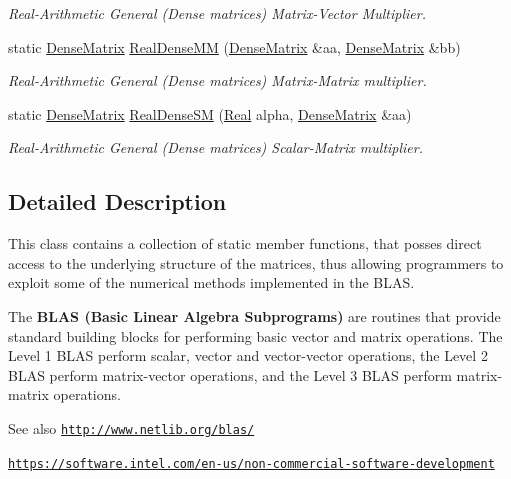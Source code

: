 \begin{DoxyCompactItemize}
\begin{DoxyCompactList}\small\item\em Real-\/\+Arithmetic General (Dense matrices) Matrix-\/\+Vector Multiplier. \end{DoxyCompactList}\item 
static \hyperlink{classmtk_1_1DenseMatrix}{Dense\+Matrix} \hyperlink{classmtk_1_1BLASAdapter_acebd0e9bfe0bdd609c7fbea98ccfd3b5}{Real\+Dense\+M\+M} (\hyperlink{classmtk_1_1DenseMatrix}{Dense\+Matrix} \&aa, \hyperlink{classmtk_1_1DenseMatrix}{Dense\+Matrix} \&bb)
\begin{DoxyCompactList}\small\item\em Real-\/\+Arithmetic General (Dense matrices) Matrix-\/\+Matrix multiplier. \end{DoxyCompactList}\item 
static \hyperlink{classmtk_1_1DenseMatrix}{Dense\+Matrix} \hyperlink{classmtk_1_1BLASAdapter_a0dd80d043615a95f11b7341ce69b44d3}{Real\+Dense\+S\+M} (\hyperlink{group__c01-roots_gac080bbbf5cbb5502c9f00405f894857d}{Real} alpha, \hyperlink{classmtk_1_1DenseMatrix}{Dense\+Matrix} \&aa)
\begin{DoxyCompactList}\small\item\em Real-\/\+Arithmetic General (Dense matrices) Scalar-\/\+Matrix multiplier. \end{DoxyCompactList}\end{DoxyCompactItemize}


\subsection{Detailed Description}
This class contains a collection of static member functions, that posses direct access to the underlying structure of the matrices, thus allowing programmers to exploit some of the numerical methods implemented in the B\+L\+A\+S.

The {\bfseries B\+L\+A\+S (Basic Linear Algebra Subprograms)} are routines that provide standard building blocks for performing basic vector and matrix operations. The Level 1 B\+L\+A\+S perform scalar, vector and vector-\/vector operations, the Level 2 B\+L\+A\+S perform matrix-\/vector operations, and the Level 3 B\+L\+A\+S perform matrix-\/matrix operations.

\begin{DoxySeeAlso}{See also}
\href{http://www.netlib.org/blas/}{\tt http\+://www.\+netlib.\+org/blas/}

\href{https://software.intel.com/en-us/non-commercial-software-development}{\tt https\+://software.\+intel.\+com/en-\/us/non-\/commercial-\/software-\/development} 
\end{DoxySeeAlso}


